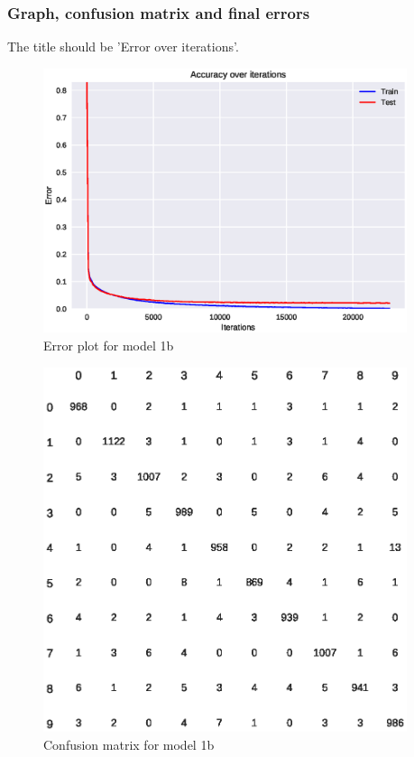 \documentclass{article}
\begin{document}
\subsubsection{Graph, confusion matrix and final errors}

The title should be 'Error over iterations'.

\begin{figure}[H]
  \centering
  \includegraphics[width=0.95\textwidth]{error_1b.eps}
  \caption{Error plot for model 1b}
  \label{fig:err_1b}
\end{figure}

\begin{figure}[H]
  \centering
  \includegraphics[width=0.95\textwidth]{confusion_matrix_1b.eps}
  \caption{Confusion matrix for model 1b}
  \label{fig:conf_1b}
\end{figure}
\end{document}
